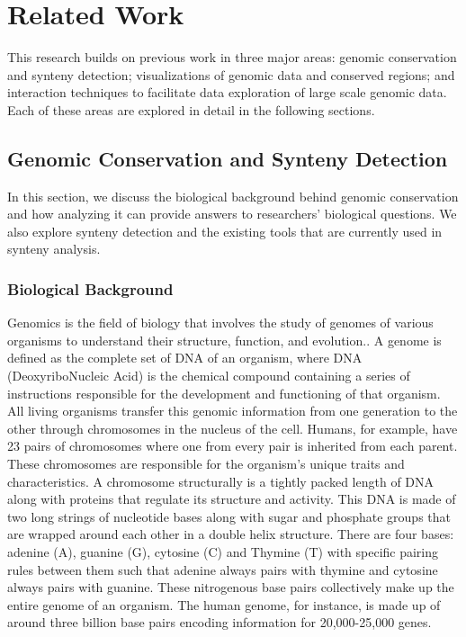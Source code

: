 \chapter{Related Work}

This research builds on previous work in three major areas:  genomic conservation and synteny detection; visualizations of genomic data and conserved regions; and interaction techniques to facilitate data exploration of large scale genomic data. Each of these areas are explored in detail in the following sections.

\section{Genomic Conservation and Synteny Detection}
In this section, we discuss the biological background behind genomic conservation and how analyzing it can provide answers to researchers' biological questions. We also explore synteny detection and the existing tools that are currently used in synteny analysis.

\subsection{Biological Background}

Genomics is the field of biology that involves the study of genomes of various organisms to understand their structure, function, and evolution.\cite{world2002genomics}. A genome is defined as the complete set of DNA of an organism, where DNA (DeoxyriboNucleic Acid) is the chemical compound containing a series of instructions responsible for the development and functioning of that organism\cite{genomegov}. All living organisms transfer this genomic information from one generation to the other through chromosomes in the nucleus of the cell. Humans, for example, have 23 pairs of chromosomes where one from every pair is inherited from each parent. These chromosomes are responsible for the organism's unique traits and characteristics. A chromosome structurally is a tightly packed length of DNA along with proteins that regulate its structure and activity. This DNA is made of two long strings of nucleotide bases along with sugar and phosphate groups that are wrapped around each other in a double helix structure. There are four bases: adenine (A), guanine (G), cytosine (C) and Thymine (T) with specific pairing rules between them such that adenine always pairs with thymine and cytosine always pairs with guanine. These nitrogenous base pairs collectively make up the entire genome of an organism\cite{ussery2009computing}. The human genome, for instance, is made up of around three billion base pairs encoding information for 20,000-25,000 genes\cite{international2004finishing}. 


